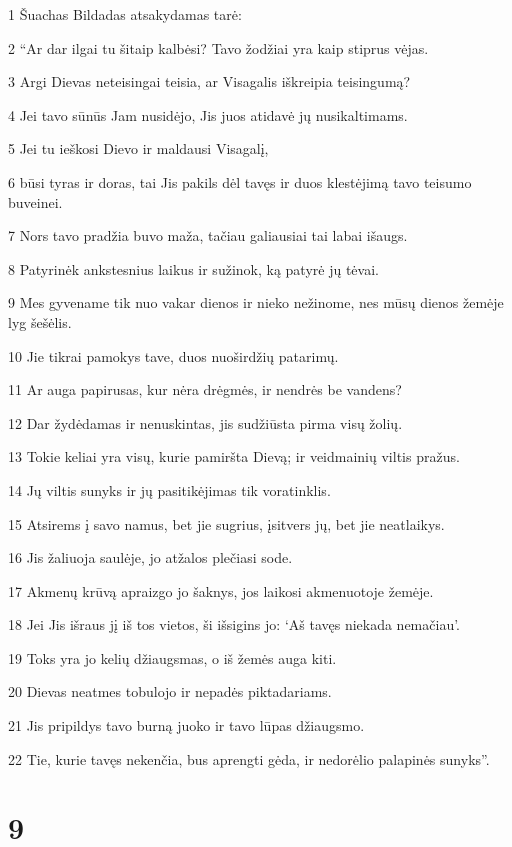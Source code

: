 \par 1 Šuachas Bildadas atsakydamas tarė: 
\par 2 “Ar dar ilgai tu šitaip kalbėsi? Tavo žodžiai yra kaip stiprus vėjas. 
\par 3 Argi Dievas neteisingai teisia, ar Visagalis iškreipia teisingumą? 
\par 4 Jei tavo sūnūs Jam nusidėjo, Jis juos atidavė jų nusikaltimams. 
\par 5 Jei tu ieškosi Dievo ir maldausi Visagalį, 
\par 6 būsi tyras ir doras, tai Jis pakils dėl tavęs ir duos klestėjimą tavo teisumo buveinei. 
\par 7 Nors tavo pradžia buvo maža, tačiau galiausiai tai labai išaugs. 
\par 8 Patyrinėk ankstesnius laikus ir sužinok, ką patyrė jų tėvai. 
\par 9 Mes gyvename tik nuo vakar dienos ir nieko nežinome, nes mūsų dienos žemėje lyg šešėlis. 
\par 10 Jie tikrai pamokys tave, duos nuoširdžių patarimų. 
\par 11 Ar auga papirusas, kur nėra drėgmės, ir nendrės be vandens? 
\par 12 Dar žydėdamas ir nenuskintas, jis sudžiūsta pirma visų žolių. 
\par 13 Tokie keliai yra visų, kurie pamiršta Dievą; ir veidmainių viltis pražus. 
\par 14 Jų viltis sunyks ir jų pasitikėjimas­ tik voratinklis. 
\par 15 Atsirems į savo namus, bet jie sugrius, įsitvers jų, bet jie neatlaikys. 
\par 16 Jis žaliuoja saulėje, jo atžalos plečiasi sode. 
\par 17 Akmenų krūvą apraizgo jo šaknys, jos laikosi akmenuotoje žemėje. 
\par 18 Jei Jis išraus jį iš tos vietos, ši išsigins jo: ‘Aš tavęs niekada nemačiau’. 
\par 19 Toks yra jo kelių džiaugsmas, o iš žemės auga kiti. 
\par 20 Dievas neatmes tobulojo ir nepadės piktadariams. 
\par 21 Jis pripildys tavo burną juoko ir tavo lūpas džiaugsmo. 
\par 22 Tie, kurie tavęs nekenčia, bus aprengti gėda, ir nedorėlio palapinės sunyks”.



\chapter{9}

